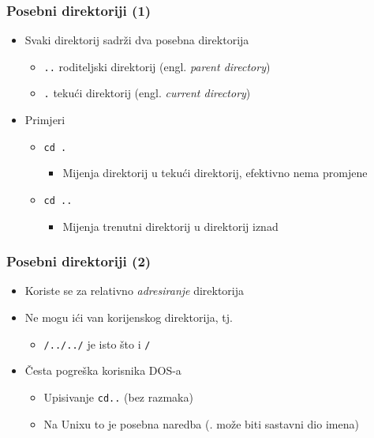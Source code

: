 \documentclass{beamer}
\begin{document}
\begin{frame}[t]
\frametitle{Posebni direktoriji (1)}
\begin{itemize}
  \item Svaki direktorij sadrži dva posebna direktorija
  \begin{itemize}
    \item \texttt{..} roditeljski direktorij (engl. \emph{parent directory})
    \item \texttt{.} tekući direktorij (engl. \emph{current directory})
  \end{itemize}
  \item Primjeri
  \begin{itemize}
    \item \texttt{cd . } 
    \begin{itemize}
      \item Mijenja direktorij u tekući direktorij, efektivno nema 
               promjene
    \end{itemize}
    \item \texttt{cd .. }
    \begin{itemize}
      \item Mijenja trenutni direktorij u direktorij iznad
    \end{itemize}
  \end{itemize}
\end{itemize}
\end{frame}

\begin{frame}[t]
\frametitle{Posebni direktoriji (2)}
\begin{itemize}
  \item Koriste se za relativno \emph{adresiranje} direktorija
  \item Ne mogu ići van korijenskog direktorija, tj.
  \begin{itemize}
    \item[] \texttt{/../../} je isto što i \texttt{/}
  \end{itemize}
  \item Česta pogreška korisnika DOS-a
  \begin{itemize}
    \item Upisivanje \texttt{cd..} (bez razmaka)
    \item Na Unixu to je posebna naredba (\emph{.} može biti sastavni dio 
          imena)
  \end{itemize}
\end{itemize}
\end{frame}
\end{document}
